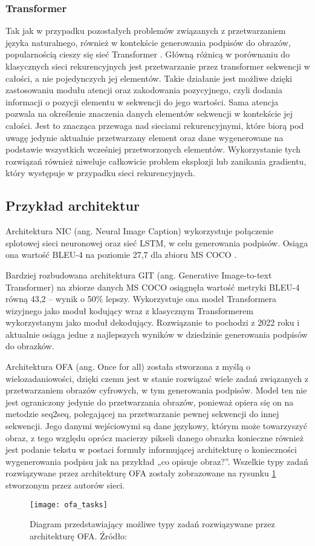 \subsubsection{Transformer}
Tak jak w przypadku pozostałych problemów związanych z przetwarzaniem języka naturalnego, również w kontekście generowania podpisów do obrazów, popularnością cieszy się sieć Transformer \cite{transformer}. Główną różnicą w porównaniu do klasycznych sieci rekurencyjnych jest przetwarzanie przez transformer sekwencji w całości, a nie pojedynczych jej elementów. Takie działanie jest możliwe dzięki zastosowaniu modułu atencji oraz zakodowania pozycyjnego, czyli dodania informacji o pozycji elementu w sekwencji do jego wartości. Sama atencja pozwala na określenie znaczenia danych elementów sekwencji w kontekście jej całości. Jest to znacząca przewaga nad sieciami rekurencyjnymi, które biorą pod uwagę jedynie aktualnie przetwarzany element oraz dane wygenerowane na podstawie wszystkich wcześniej przetworzonych elementów. Wykorzystanie tych rozwiązań również niweluje całkowicie problem eksplozji lub zanikania gradientu, który występuje w przypadku sieci rekurencyjnych.
\subsection{Przykład architektur}
Architektura NIC (ang. Neural Image Caption) \cite{nic} wykorzystuje połączenie splotowej sieci neuronowej oraz sieć LSTM, w celu generowania podpisów. Osiąga ona wartość BLEU-4 na poziomie 27,7 dla zbioru MS COCO \cite{mscoco}.

Bardziej rozbudowana architektura GIT (ang. Generative Image-to-text Transformer) \cite{wang2022git} na zbiorze danych MS COCO osiągnęła wartość metryki BLEU-4 równą 43,2 -- wynik o 50\% lepszy. Wykorzystuje ona model Transformera wizyjnego jako moduł kodujący wraz z klasycznym Transformerem wykorzystanym jako moduł dekodujący. Rozwiązanie to pochodzi z 2022 roku i aktualnie osiąga jedne z najlepszych wyników w dziedzinie generowania podpisów do obrazków.

Architektura OFA (ang. Once for all) \cite{wang2022ofa} została stworzona z myślą o wielozadaniowości, dzięki czemu jest w stanie rozwiązać wiele zadań związanych z przetwarzaniem obrazów cyfrowych, w tym generowania podpisów. Model ten nie jest ograniczony jedynie do przetwarzania obrazów, ponieważ opiera się on na metodzie seq2seq, polegającej na przetwarzanie pewnej sekwencji do innej sekwencji. Jego danymi wejściowymi są dane językowy, którym może towarzyszyć obraz, z tego względu oprócz macierzy pikseli danego obrazka konieczne również jest podanie tekstu w postaci formuły informującej architekturę o konieczności wygenerowania podpisu jak na przykład „co opisuje obraz?”. Wszelkie typy zadań rozwiązywane przez architekturę OFA zostały zobrazowane na rysunku \ref{fig:ofa-tasks} stworzonym przez autorów sieci.
\begin{figure}[H]
  \centering
  \texttt{[image: ofa\_tasks]}
  \caption{Diagram przedstawiający możliwe typy zadań rozwiązywane przez architekturę OFA. Źródło: \cite{wang2022ofa}}
  \label{fig:ofa-tasks}
\end{figure}
